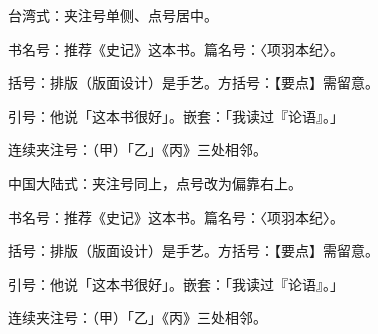 \documentclass{ltc-tw-vbook}
\begin{document}
\begin{正文}[分栏=2, 栏间距=16pt]

台湾式：夹注号单侧、点号居中。

书名号：推荐《史记》这本书。篇名号：〈项羽本纪〉。

括号：排版（版面设计）是手艺。方括号：【要点】需留意。

引号：他说「这本书很好」。嵌套：「我读过『论语』。」

连续夹注号：（甲）「乙」《丙》三处相邻。

\end{正文}


\begin{正文}[分栏=2, 栏间距=16pt]

中国大陆式：夹注号同上，点号改为偏靠右上。

书名号：推荐《史记》这本书。篇名号：〈项羽本纪〉。

括号：排版（版面设计）是手艺。方括号：【要点】需留意。

引号：他说「这本书很好」。嵌套：「我读过『论语』。」

连续夹注号：（甲）「乙」《丙》三处相邻。

\end{正文}
\end{document}
